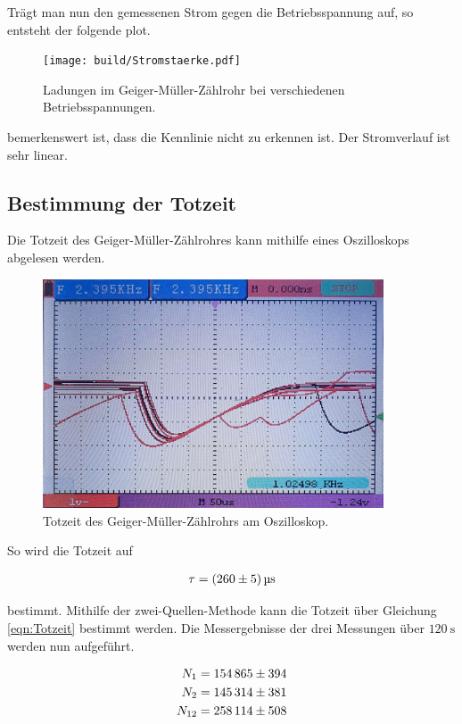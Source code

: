 \noindent Trägt man nun den gemessenen Strom gegen die Betriebsspannung auf, so entsteht der folgende plot.

\begin{figure}[H]
    \centering
    \texttt{[image: build/Stromstaerke.pdf]}
    \caption{Ladungen im Geiger-Müller-Zählrohr bei verschiedenen Betriebsspannungen.}
\end{figure}

\noindent bemerkenswert ist, dass die Kennlinie nicht zu erkennen ist. Der Stromverlauf ist sehr linear.



\subsection{Bestimmung der Totzeit}
\noindent Die Totzeit des Geiger-Müller-Zählrohres kann mithilfe eines Oszilloskops abgelesen werden. 

\begin{figure}[H]
    \centering
    \includegraphics[width=0.9\textwidth]{content/Oszilloskop.jpg}
    \caption{Totzeit des Geiger-Müller-Zählrohrs am Oszilloskop.}
    \label{fig:Oszilloskop}
\end{figure}

\noindent So wird die Totzeit auf 

\begin{align*}
    \tau = \qty{260\pm5}{\micro \second}
\end{align*}

\noindent bestimmt.
Mithilfe der zwei-Quellen-Methode kann die Totzeit über Gleichung \eqref{eqn:Totzeit} bestimmt werden. Die Messergebnisse der drei 
Messungen über $\qty{120}{\second}$ werden nun aufgeführt.

\begin{align*}
    N_{1 } &= \num{154865\pm394}    \\
    N_{2 } &= \num{145314\pm381}    \\
    N_{12} &= \num{258114\pm508}    \\
\end{align*}

